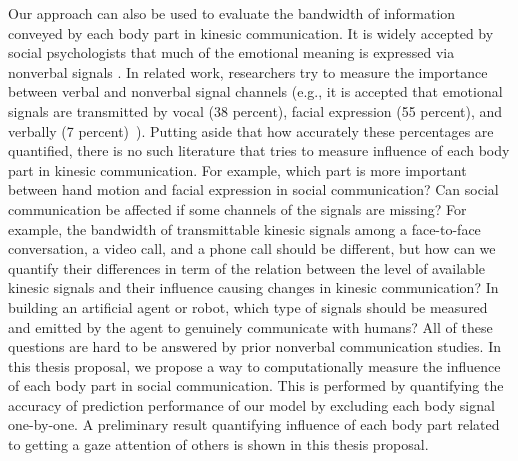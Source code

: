 Our approach can also be used to evaluate the bandwidth of information conveyed by each body part in kinesic communication. It is widely accepted by social psychologists that much of the emotional meaning is expressed via nonverbal signals \cite{Mehrabian67, Mehrabian81, Birdwhistell70, Moore13}. In related work, researchers try to measure the importance between verbal and nonverbal signal channels (e.g., it is accepted that emotional signals are transmitted by vocal (38 percent), facial expression (55 percent), and verbally (7 percent)~\cite{Mehrabian67, Mehrabian81}). Putting aside that how accurately these percentages are quantified, there is no such literature that tries to measure influence of each body part in kinesic communication. For example, which part is more important between hand motion and facial expression in social communication? Can social communication be affected if some channels of the signals are missing? For example, the bandwidth of transmittable kinesic signals among a face-to-face conversation, a video call, and a phone call should be different, but how can we quantify their differences in term of the relation between the level of available kinesic signals and their influence causing changes in kinesic communication? In building an artificial agent or robot, which type of signals should be measured and emitted by the agent to genuinely communicate with humans? All of these questions are hard to be answered by prior nonverbal communication studies. In this thesis proposal, we propose a way to computationally measure the influence of each body part in social communication. This is performed by quantifying the accuracy of prediction performance of our model by excluding each body signal one-by-one. A preliminary result quantifying influence of each body part related to getting a gaze attention of others is shown in this thesis proposal.  


